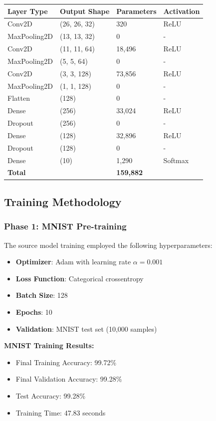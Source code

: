 \documentclass[12pt,a4paper]{article}
\begin{document}
\begin{center}
\begin{tabular}{|l|l|l|l|}
\hline
\textbf{Layer Type} & \textbf{Output Shape} & \textbf{Parameters} & \textbf{Activation} \\
\hline
Conv2D & (26, 26, 32) & 320 & ReLU \\
MaxPooling2D & (13, 13, 32) & 0 & - \\
Conv2D & (11, 11, 64) & 18,496 & ReLU \\
MaxPooling2D & (5, 5, 64) & 0 & - \\
Conv2D & (3, 3, 128) & 73,856 & ReLU \\
MaxPooling2D & (1, 1, 128) & 0 & - \\
Flatten & (128) & 0 & - \\
Dense & (256) & 33,024 & ReLU \\
Dropout & (256) & 0 & - \\
Dense & (128) & 32,896 & ReLU \\
Dropout & (128) & 0 & - \\
Dense & (10) & 1,290 & Softmax \\
\hline
\textbf{Total} & & \textbf{159,882} & \\
\hline
\end{tabular}
\end{center}

\subsection{Training Methodology}

\subsubsection{Phase 1: MNIST Pre-training}

The source model training employed the following hyperparameters:
\begin{itemize}
    \item \textbf{Optimizer}: Adam with learning rate $\alpha = 0.001$
    \item \textbf{Loss Function}: Categorical crossentropy
    \item \textbf{Batch Size}: 128
    \item \textbf{Epochs}: 10
    \item \textbf{Validation}: MNIST test set (10,000 samples)
\end{itemize}

\textbf{MNIST Training Results:}
\begin{itemize}
    \item Final Training Accuracy: 99.72\%
    \item Final Validation Accuracy: 99.28\%
    \item Test Accuracy: 99.28\%
    \item Training Time: 47.83 seconds
\end{itemize}
\end{document}
